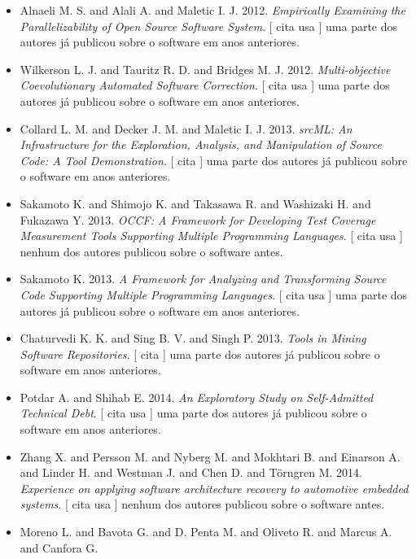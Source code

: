 \begin{itemize}
\item Alnaeli M. S. and Alali A. and Maletic I. J.
      2012.
        \textit{ Empirically Examining the Parallelizability of Open Source Software System}.
      [
          cita
          usa
      ]
uma parte dos autores já publicou sobre o software em anos anteriores.
\item Wilkerson L. J. and Tauritz R. D. and Bridges M. J.
      2012.
        \textit{ Multi-objective Coevolutionary Automated Software Correction}.
      [
          cita
          usa
      ]
uma parte dos autores já publicou sobre o software em anos anteriores.
\item Collard L. M. and Decker J. M. and Maletic I. J.
      2013.
        \textit{ srcML: An Infrastructure for the Exploration, Analysis, and Manipulation of Source Code: A Tool Demonstration}.
      [
          cita
      ]
uma parte dos autores já publicou sobre o software em anos anteriores.
\item Sakamoto K. and Shimojo K. and Takasawa R. and Washizaki H. and Fukazawa Y.
      2013.
        \textit{ OCCF: A Framework for Developing Test Coverage Measurement Tools Supporting Multiple Programming Languages}.
      [
          cita
          usa
      ]
nenhum dos autores publicou sobre o software antes.
\item Sakamoto K.
      2013.
        \textit{ A Framework for Analyzing and Transforming Source Code Supporting Multiple Programming Languages}.
      [
          cita
          usa
      ]
uma parte dos autores já publicou sobre o software em anos anteriores.
\item Chaturvedi K. K. and Sing B. V. and Singh P.
      2013.
        \textit{ Tools in Mining Software Repositories}.
      [
          cita
      ]
uma parte dos autores já publicou sobre o software em anos anteriores.
\item Potdar A. and Shihab E.
      2014.
        \textit{ An Exploratory Study on Self-Admitted Technical Debt}.
      [
          cita
          usa
      ]
uma parte dos autores já publicou sobre o software em anos anteriores.
\item Zhang X. and Persson M. and Nyberg M. and Mokhtari B. and Einarson A. and Linder H. and Westman J. and Chen D. and Törngren M.
      2014.
        \textit{ Experience on applying software architecture recovery to automotive embedded systems}.
      [
          cita
          usa
      ]
nenhum dos autores publicou sobre o software antes.
\item Moreno L. and Bavota G. and D. Penta M. and Oliveto R. and Marcus A. and Canfora G.

\end{itemize}
